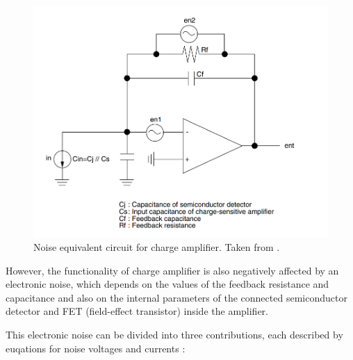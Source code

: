 \begin{figure}[H]
 \centering
 \includegraphics[scale=0.4, angle = 0]{./pictures/NoiseEquiv.png}
 \caption{Noise equivalent circuit for charge amplifier. Taken from \cite{charge}.}
 \label{trans}
 
\end{figure}


However, the functionality of charge amplifier is also negatively affected by an electronic noise, which depends on the values of the feedback resistance and capacitance and also on the internal parameters of the connected semiconductor detector and FET (field-effect transistor) inside the amplifier.

This electronic noise can be divided into three contributions, each described by euqations for noise voltages and currents \cite{charge}:

